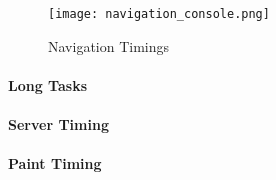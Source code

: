 \begin{figure}[h!]
\begin{center}
\texttt{[image: navigation\_console.png]}
\caption{Navigation Timings}
\label{img:navigation_console}
\end{center}
\end{figure}











\paragraph{Long Tasks}







\paragraph{Server Timing}








\paragraph{Paint Timing}




